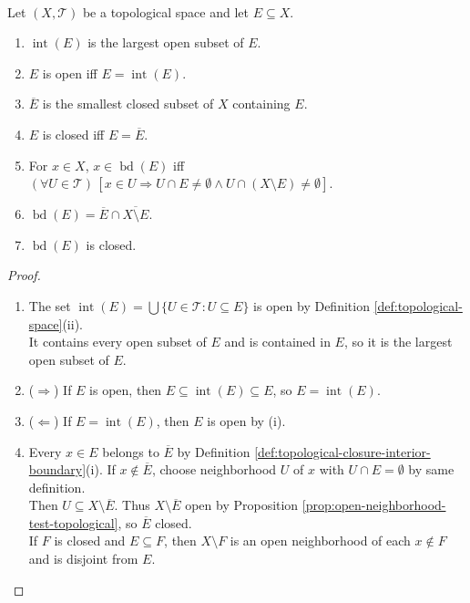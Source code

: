 \begin{proposition} \label{prop:topological-closure-closed-calculus} \\
Let $(X,\mathcal{T})$ be a topological space and let $E\subseteq X$.
\begin{enumerate}[label=(\roman*)]
\setlength{\itemsep}{0pt}
\item $\operatorname{int}(E)$ is the largest open subset of $E$.
\item $E$ is open iff $E=\operatorname{int}(E)$.
\item $\overline{E}$ is the smallest closed subset of $X$ containing $E$.
\item $E$ is closed iff $E=\overline{E}$.
\item For $x\in X$, $x\in\operatorname{bd}(E)$ iff $(\forall U\in\mathcal{T})\,[x\in U\Rightarrow U\cap E\neq\emptyset\land U\cap(X\setminus E)\neq\emptyset]$.
\item $\operatorname{bd}(E)=\overline{E}\cap\overline{X\setminus E}$.
\item $\operatorname{bd}(E)$ is closed.
\end{enumerate}
\begin{proof}
\begin{enumerate}[label=(\roman*)]
\setlength{\itemsep}{0pt}
\item[$(i)$] The set $\operatorname{int}(E)=\bigcup\{U\in\mathcal{T}:U\subseteq E\}$ is open by Definition \ref{def:topological-space}(ii).\\
It contains every open subset of $E$ and is contained in $E$, so it is the largest open subset of $E$.
\item[$(ii)$] ($\Rightarrow$) If $E$ is open, then $E\subseteq\operatorname{int}(E)\subseteq E$, so $E=\operatorname{int}(E)$.
\item[$(ii)$] ($\Leftarrow$) If $E=\operatorname{int}(E)$, then $E$ is open by (i).
\item[$(iii)$] Every $x\in E$ belongs to $\overline{E}$ by Definition \ref{def:topological-closure-interior-boundary}(i). If $x\notin\overline{E}$, choose neighborhood $U$ of $x$ with $U\cap E=\emptyset$ by same definition.\\
Then $U\subseteq X\setminus\overline{E}$. Thus $X\setminus\overline{E}$ open by Proposition \ref{prop:open-neighborhood-test-topological}, so $\overline{E}$ closed.\\
If $F$ is closed and $E\subseteq F$, then $X\setminus F$ is an open neighborhood of each $x\notin F$ and is disjoint from $E$.\\

\end{enumerate}
\end{proof}
\end{proposition}
